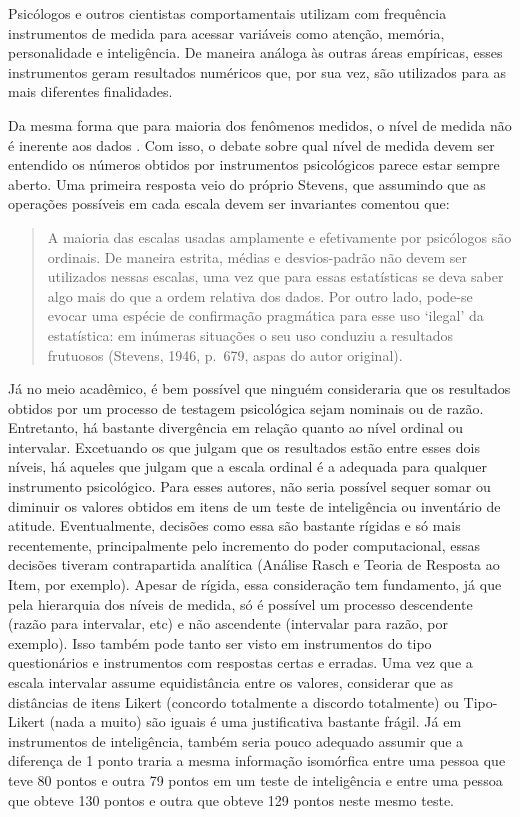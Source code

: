 \documentclass[
]{book}
\begin{document}
Psicólogos e outros cientistas comportamentais utilizam com frequência instrumentos de medida para acessar variáveis como atenção, memória, personalidade e inteligência. De maneira análoga às outras áreas empíricas, esses instrumentos geram resultados numéricos que, por sua vez, são utilizados para as mais diferentes finalidades.

Da mesma forma que para maioria dos fenômenos medidos, o nível de medida não é inerente aos dados \citep{Velleman1993}. Com isso, o debate sobre qual nível de medida devem ser entendido os números obtidos por instrumentos psicológicos parece estar sempre aberto. Uma primeira resposta veio do próprio Stevens, que assumindo que as operações possíveis em cada escala devem ser invariantes comentou que:

\begin{quote}
A maioria das escalas usadas amplamente e efetivamente por psicólogos são ordinais. De maneira estrita, médias e desvios-padrão não devem ser utilizados nessas escalas, uma vez que para essas estatísticas se deva saber algo mais do que a ordem relativa dos dados. Por outro lado, pode-se evocar uma espécie de confirmação pragmática para esse uso `ilegal' da estatística: em inúmeras situações o seu uso conduziu a resultados frutuosos (Stevens, 1946, p.~679, aspas do autor original).
\end{quote}

Já no meio acadêmico, é bem possível que ninguém consideraria que os resultados obtidos por um processo de testagem psicológica sejam nominais ou de razão. Entretanto, há bastante divergência em relação quanto ao nível ordinal ou intervalar. Excetuando os que julgam que os resultados estão entre esses dois níveis, há aqueles que julgam que a escala ordinal é a adequada para qualquer instrumento psicológico. Para esses autores, não seria possível sequer somar ou diminuir os valores obtidos em itens de um teste de inteligência ou inventário de atitude. Eventualmente, decisões como essa são bastante rígidas e só mais recentemente, principalmente pelo incremento do poder computacional, essas decisões tiveram contrapartida analítica (Análise Rasch e Teoria de Resposta ao Item, por exemplo).
Apesar de rígida, essa consideração tem fundamento, já que pela hierarquia dos níveis de medida, só é possível um processo descendente (razão para intervalar, etc) e não ascendente (intervalar para razão, por exemplo). Isso também pode tanto ser visto em instrumentos do tipo questionários e instrumentos com respostas certas e erradas. Uma vez que a escala intervalar assume equidistância entre os valores, considerar que as distâncias de itens Likert (concordo totalmente a discordo totalmente) ou Tipo-Likert (nada a muito) são iguais é uma justificativa bastante frágil. Já em instrumentos de inteligência, também seria pouco adequado assumir que a diferença de 1 ponto traria a mesma informação isomórfica entre uma pessoa que teve 80 pontos e outra 79 pontos em um teste de inteligência e entre uma pessoa que obteve 130 pontos e outra que obteve 129 pontos neste mesmo teste.
\end{document}
